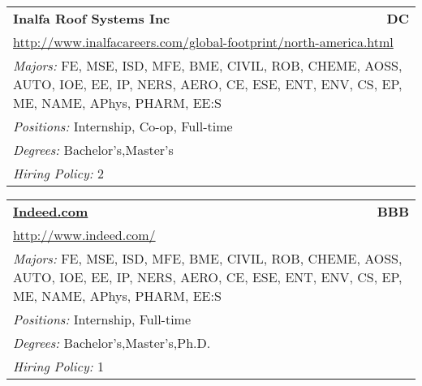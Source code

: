 \documentclass[twoside]{article}
\begin{document}
\begin{center}
\begin{multicols}{3}
\begin{FlushLeft}
\begin{minipage}{.9\columnwidth}
\end{minipage}
 
\begin{minipage}{.9\columnwidth}\begin{tabularx}{.95\columnwidth}{Xr}
                 {\Large\bf Inalfa Roof Systems Inc} & {\Large\bf DC}\\
    \multicolumn{2}{p{.95\columnwidth}}{\url{http://www.inalfacareers.com/global-footprint/north-america.html}}\\
    \multicolumn{2}{p{.95\columnwidth}}{\emph{Majors:} FE, MSE, ISD, MFE, BME, CIVIL, ROB, CHEME, AOSS, AUTO, IOE, EE, IP, NERS, AERO, CE, ESE, ENT, ENV, CS, EP, ME, NAME, APhys, PHARM, EE:S}\\
    \multicolumn{2}{p{.95\columnwidth}}{\emph{Positions:} Internship, Co-op, Full-time}\\
    \multicolumn{2}{p{.95\columnwidth}}{\emph{Degrees:} Bachelor's,Master's}\\
    \multicolumn{2}{p{.95\columnwidth}}{\emph{Hiring Policy:} 2}\\
    \end{tabularx}
    
\end{minipage}
 
\begin{minipage}{.9\columnwidth}\begin{tabularx}{.95\columnwidth}{Xr}
                 {\Large\bf \url{Indeed.com}} & {\Large\bf BBB}\\
    \multicolumn{2}{p{.95\columnwidth}}{\url{http://www.indeed.com/}}\\
    \multicolumn{2}{p{.95\columnwidth}}{\emph{Majors:} FE, MSE, ISD, MFE, BME, CIVIL, ROB, CHEME, AOSS, AUTO, IOE, EE, IP, NERS, AERO, CE, ESE, ENT, ENV, CS, EP, ME, NAME, APhys, PHARM, EE:S}\\
    \multicolumn{2}{p{.95\columnwidth}}{\emph{Positions:} Internship, Full-time}\\
    \multicolumn{2}{p{.95\columnwidth}}{\emph{Degrees:} Bachelor's,Master's,Ph.D.}\\
    \multicolumn{2}{p{.95\columnwidth}}{\emph{Hiring Policy:} 1}\\
    \end{tabularx}
    
\end{minipage}
 

\end{FlushLeft}
\end{multicols}
\end{center}
\end{document}
